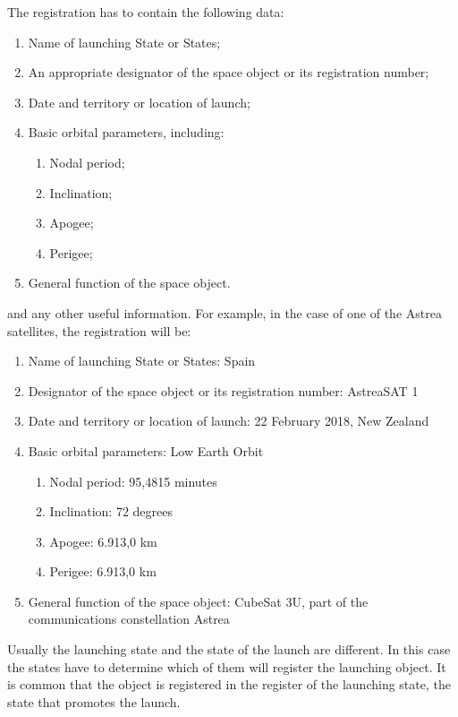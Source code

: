 \newline
\newline
The registration has to contain the following data:
\begin{enumerate}[label=\alph*)]
\item Name of launching State or States;
\item An appropriate designator of the space object or its registration number;
\item Date and territory or location of launch;
\item Basic orbital parameters, including:
\begin{enumerate}[label=\Roman*)]
\item Nodal period;
\item Inclination;
\item Apogee;
\item Perigee;
\end{enumerate}
\item General function of the space object.
\end{enumerate}
and any other useful information.
For example, in the case of one of the Astrea satellites, the registration will be:
\begin{enumerate}[label=\alph*)]
\item Name of launching State or States: Spain
\item Designator of the space object or its registration number: AstreaSAT 1
\item Date and territory or location of launch: 22 February 2018, New Zealand
\item Basic orbital parameters: Low Earth Orbit
\begin{enumerate}[label=\Roman*)]
\item Nodal period: 95,4815 minutes
\item Inclination: 72 degrees
\item Apogee: 6.913,0 km
\item Perigee: 6.913,0 km
\end{enumerate}
\item General function of the space object: CubeSat 3U, part of the communications constellation Astrea
\end{enumerate}

Usually the launching state and the state of the launch are different. In this case the states have to determine which of them will register the launching object. It is common that the object is registered in the register of the launching state, the state that promotes the launch.